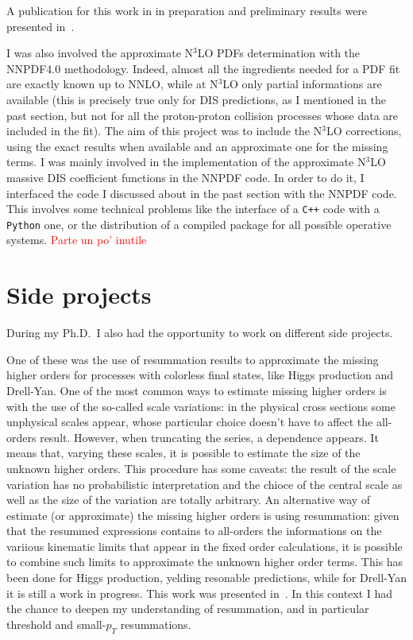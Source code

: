 \documentclass[11pt,a4paper]{moderncv}        %
\begin{document}
A publication for this work in in preparation and preliminary results were presented in~\cite{LAURENTI2023}.

I was also involved the approximate N$^3$LO PDFs determination with the NNPDF4.0 methodology.
Indeed, almost all the ingredients needed for a PDF fit are exactly known up to NNLO, while at N$^3$LO only partial informations
are available (this is precisely true only for DIS predictions, as I mentioned in the past section, but not for all the proton-proton
collision processes whose data are included in the fit).
The aim of this project was to include the N$^3$LO corrections, using the exact results when available and an approximate one
for the missing terms.
I was mainly involved in the implementation of the approximate N$^3$LO massive DIS coefficient functions in the NNPDF code.
In order to do it, I interfaced the code I discussed about in the past section with the NNPDF code.
This involves some technical problems like the interface of a \texttt{C++} code with a \texttt{Python} one, or the distribution of
a compiled package for all possible operative systems. \textcolor{red}{Parte un po' inutile}


\section{Side projects}

During my Ph.D.\ I also had the opportunity to work on different side projects.

One of these was the use of resummation results to approximate the missing higher orders for processes with colorless final states,
like Higgs production and Drell-Yan.
One of the most common ways to estimate missing higher orders is with the use of the so-called scale variations:
in the physical cross sections some unphysical scales appear, whose particular choice doesn't have to affect the all-orders result.
However, when truncating the series, a dependence appears.
It means that, varying these scales, it is possible to estimate the size of the unknown higher orders.
This procedure has some caveats: the result of the scale variation has no probabilistic interpretation and the chioce of
the central scale as well as the size of the variation are totally arbitrary.
An alternative way of estimate (or approximate) the missing higher orders is using resummation: given that the resummed expressions
contains to all-orders the informations on the variious kinematic limits that appear in the fixed order calculations, it is possible
to combine such limits to approximate the unknown higher order terms.
This has been done for Higgs production, yelding resonable predictions, while for Drell-Yan it is still a work in progress.
This work was presented in~\cite{laurenti2022approximating}.
In this context I had the chance to deepen my understanding of resummation, and in particular threshold and small-$p_T$ resummations.
\end{document}
